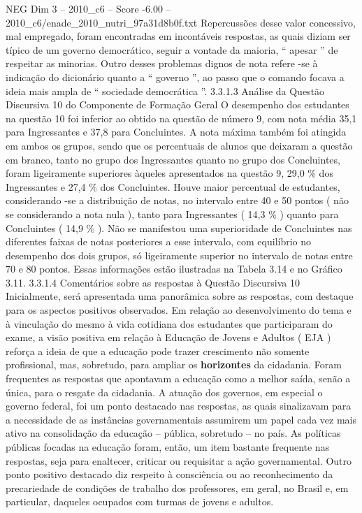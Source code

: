 \begin{textsample}{NEG Dim 3 – 2010\_c6 – Score -6.00 – 2010\_c6/enade\_2010\_nutri\_97a31d8b0f.txt}
Repercussões desse valor concessivo, mal empregado, foram encontradas em incontáveis respostas, as quais diziam ser típico de um governo democrático, seguir a vontade da maioria, “ apesar ” de respeitar as minorias.
Outro desses problemas dignos de nota refere -se à indicação do dicionário quanto a “ governo ”, ao passo que o comando focava a ideia mais ampla de “ sociedade democrática ”. 3.3.1.3 Análise da Questão Discursiva 10 do Componente de Formação Geral O desempenho dos estudantes na questão 10 foi inferior ao obtido na questão de número 9, com nota média 35,1 para Ingressantes e 37,8 para Concluintes.
A nota máxima também foi atingida em ambos os grupos, sendo que os percentuais de alunos que deixaram a questão em branco, tanto no grupo dos Ingressantes quanto no grupo dos Concluintes, foram ligeiramente superiores àqueles apresentados na questão 9, 29,0 \% dos Ingressantes e 27,4 \% dos Concluintes.
Houve maior percentual de estudantes, considerando -se a distribuição de notas, no intervalo entre 40 e 50 pontos ( não se considerando a nota nula ), tanto para Ingressantes ( 14,3 \% ) quanto para Concluintes ( 14,9 \% ).
Não se manifestou uma superioridade de Concluintes nas diferentes faixas de notas posteriores a esse intervalo, com equilíbrio no desempenho dos dois grupos, só ligeiramente superior no intervalo de notas entre 70 e 80 pontos.
Essas informações estão ilustradas na Tabela 3.14 e no Gráfico 3.11. 3.3.1.4 Comentários sobre as respostas à Questão Discursiva 10 Inicialmente, será apresentada uma panorâmica sobre as respostas, com destaque para os aspectos positivos observados.
Em relação ao desenvolvimento do tema e à vinculação do mesmo à vida cotidiana dos estudantes que participaram do exame, a visão positiva em relação à Educação de Jovens e Adultos ( EJA ) reforça a ideia de que a educação pode trazer crescimento não somente profissional, mas, sobretudo, para ampliar os \textbf{horizontes} da cidadania.
Foram frequentes as respostas que apontavam a educação como a melhor saída, senão a única, para o resgate da cidadania.
A atuação dos governos, em especial o governo federal, foi um ponto destacado nas respostas, as quais sinalizavam para a necessidade de as instâncias governamentais assumirem um papel cada vez mais ativo na consolidação da educação – pública, sobretudo – no país.
As políticas públicas focadas na educação foram, então, um item bastante frequente nas respostas, seja para enaltecer, criticar ou requisitar a ação governamental.
Outro ponto positivo destacado diz respeito à consciência ou ao reconhecimento da precariedade de condições de trabalho dos professores, em geral, no Brasil e, em particular, daqueles ocupados com turmas de jovens e adultos.

\end{textsample}

